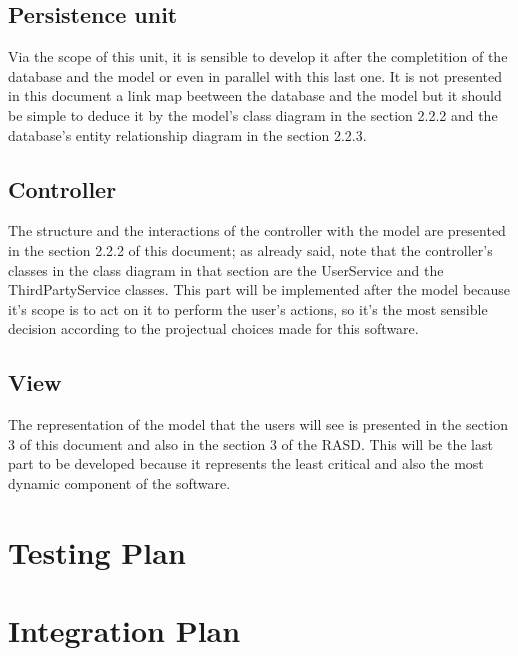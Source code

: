 \subsection{Persistence unit}
	Via the scope of this unit, it is sensible to develop it after the completition of the database and the model or even in parallel with this last one. It is not presented in this document a link map 	beetween the database and the model but it should be simple to deduce it by the model's class diagram in the section 2.2.2 and the database's entity relationship diagram in the section 			2.2.3.
\subsection{Controller}
	The structure and the interactions of the controller with the model are presented in the section 2.2.2  of this document; as already said, note that the controller's classes in the class 			diagram in that section are the UserService and the ThirdPartyService classes. This part will be implemented after the model because it's scope is to act on it to perform the user's actions, 		so it's the most sensible decision according to the projectual choices made for this software.
\subsection{View}
	The representation of the model that the users will see is presented in the section 3 of this document and also in the section 3 of the RASD. This will be the last part to be developed 			because it represents the least critical and also the most dynamic component of the software.

\section{Testing Plan}

\section{Integration Plan}
